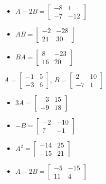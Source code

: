 \documentclass{ximera}
\begin{document}
\begin{question}
\begin{problem}
\begin{solution}
\begin{itemize}
\item  $A-2B = \left[ \begin{array}{rr} -8 & 1 \\ -7 & -12 \end{array} \right]$

\item $AB = \left[ \begin{array}{rr} -2 & -28 \\ 21 & 30 \end{array} \right]$

\item $BA = \left[ \begin{array}{rr} 8 & -23 \\ 16 & 20 \end{array} \right]$

\end{itemize}
\end{solution}
\end{problem}

\begin{problem}
$A = \left[ \begin{array}{rr} -1 & 5 \\ -3 & 6 \end{array} \right]$, $B=\left[ \begin{array}{rr} 2 & 10 \\ -7 & 1 \end{array} \right]$

\begin{solution}
\begin{itemize}
\item  $3A = \left[ \begin{array}{rr} -3 & 15 \\ -9 & 18 \end{array} \right]$

\item $-B = \left[ \begin{array}{rr} -2 & -10 \\ 7 & -1 \end{array} \right]$

\item $A^2 = \left[ \begin{array}{rr} -14 & 25 \\ -15 & 21 \end{array} \right]$

\item  $A-2B = \left[ \begin{array}{rr} -5 & -15 \\ 11 & 4 \end{array} \right]$


\end{itemize}
\end{solution}
\end{problem}
\end{question}
\end{document}
